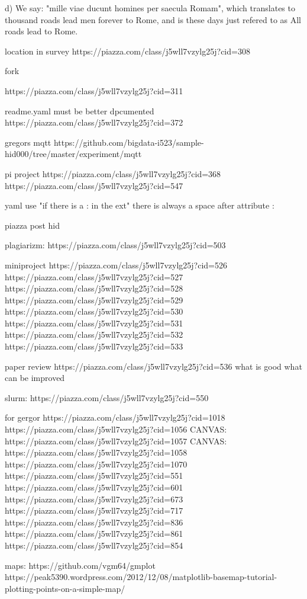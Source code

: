  

d) We say: "mille viae ducunt homines per saecula Romam", which
translates to thousand roads lead men forever to Rome, and is these
days just refered to as All roads lead to Rome.

location in survey
https://piazza.com/class/j5wll7vzylg25j?cid=308


fork

https://piazza.com/class/j5wll7vzylg25j?cid=311

readme.yaml must be better dpcumented
https://piazza.com/class/j5wll7vzylg25j?cid=372

gregors mqtt
https://github.com/bigdata-i523/sample-hid000/tree/master/experiment/mqtt

pi project
https://piazza.com/class/j5wll7vzylg25j?cid=368
https://piazza.com/class/j5wll7vzylg25j?cid=547

yaml
use "if there is a : in the ext"
there is always a space after attribute :

piazza post hid 

plagiarizm: https://piazza.com/class/j5wll7vzylg25j?cid=503

miniproject
https://piazza.com/class/j5wll7vzylg25j?cid=526
https://piazza.com/class/j5wll7vzylg25j?cid=527
https://piazza.com/class/j5wll7vzylg25j?cid=528
https://piazza.com/class/j5wll7vzylg25j?cid=529
https://piazza.com/class/j5wll7vzylg25j?cid=530
https://piazza.com/class/j5wll7vzylg25j?cid=531
https://piazza.com/class/j5wll7vzylg25j?cid=532
https://piazza.com/class/j5wll7vzylg25j?cid=533

paper review
https://piazza.com/class/j5wll7vzylg25j?cid=536
what is good
what can be improved

slurm: https://piazza.com/class/j5wll7vzylg25j?cid=550

for gergor
https://piazza.com/class/j5wll7vzylg25j?cid=1018
https://piazza.com/class/j5wll7vzylg25j?cid=1056
CANVAS: https://piazza.com/class/j5wll7vzylg25j?cid=1057
CANVAS: https://piazza.com/class/j5wll7vzylg25j?cid=1058
https://piazza.com/class/j5wll7vzylg25j?cid=1070
https://piazza.com/class/j5wll7vzylg25j?cid=551
https://piazza.com/class/j5wll7vzylg25j?cid=601
https://piazza.com/class/j5wll7vzylg25j?cid=673
https://piazza.com/class/j5wll7vzylg25j?cid=717
https://piazza.com/class/j5wll7vzylg25j?cid=836
https://piazza.com/class/j5wll7vzylg25j?cid=861
https://piazza.com/class/j5wll7vzylg25j?cid=854

maps:
https://github.com/vgm64/gmplot
https://peak5390.wordpress.com/2012/12/08/matplotlib-basemap-tutorial-plotting-points-on-a-simple-map/

